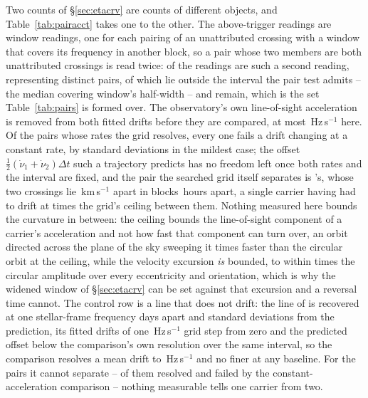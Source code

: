 Two counts of \S\ref{sec:etacrv} are counts of different objects, and
Table~\ref{tab:pairacct} takes one to the other. The \WdNExc{} above-trigger
readings are window readings, one for each pairing of an unattributed
crossing with a window that covers its frequency in another block, so a pair
whose two members are both unattributed crossings is read twice:
\PaNPairTwice{} of the readings are such a second reading, representing
\PaNPairRead{} distinct pairs, of which \PaNPairBeyond{} lie outside the
interval the pair test admits -- the median covering window's half-width --
and \PaNPairInside{} remain, which is the set Table~\ref{tab:pairs} is formed
over. The observatory's own line-of-sight acceleration is removed from both
fitted drifts before they are compared, at most \TjFrameMaxHzS\,Hz\,s$^{-1}$
here. Of the \TjNPower{} pairs whose rates the grid resolves, every one fails
a drift changing at a constant rate, by \TjSigMin{} standard deviations in
the mildest case; the offset
$\frac{1}{2}(\dot\nu_1+\dot\nu_2)\Delta t$ such a
trajectory predicts has no freedom left once both rates and the interval are
fixed, and the pair the searched grid itself separates is \EcGridStar's,
whose two crossings lie \EcGridDvKms\,km\,s$^{-1}$ apart in blocks
\EcGridDtH\,hours apart, a single carrier having had to drift at
\EcGridFactor{} times the grid's ceiling between them. Nothing measured here
bounds the curvature in between: the ceiling bounds the line-of-sight
component of a carrier's acceleration and not how fast that component can
turn over, an orbit directed across the plane of the sky sweeping it
\EcRateSupFac{} times faster than the circular orbit at the ceiling, while
the velocity excursion \emph{is} bounded, to within \EcVsupFac{} times the
circular amplitude over every eccentricity and orientation, which is why the
widened window of \S\ref{sec:etacrv} can be set against that excursion and a
reversal time cannot. The control row is a line
that does not drift: the \TjCtlLine{} line of \TjCtlStar{} is recovered at
one stellar-frame frequency \TjCtlDtD{} days apart and \TjCtlNSig{} standard
deviations from the prediction, its fitted drifts \TjCtlDriftStep{} of one
\TjCtlStepHzS\,Hz\,s$^{-1}$ grid step from zero and the predicted offset
below the comparison's own resolution over the same interval, so the
comparison resolves a mean drift to \TjCtlDriftResHzS\,Hz\,s$^{-1}$ and no
finer at any baseline. For the \TjNOpen{} pairs it cannot separate --
\TjNPowerOpen{} of them resolved and failed by the constant-acceleration
comparison -- nothing measurable tells one carrier from two.

